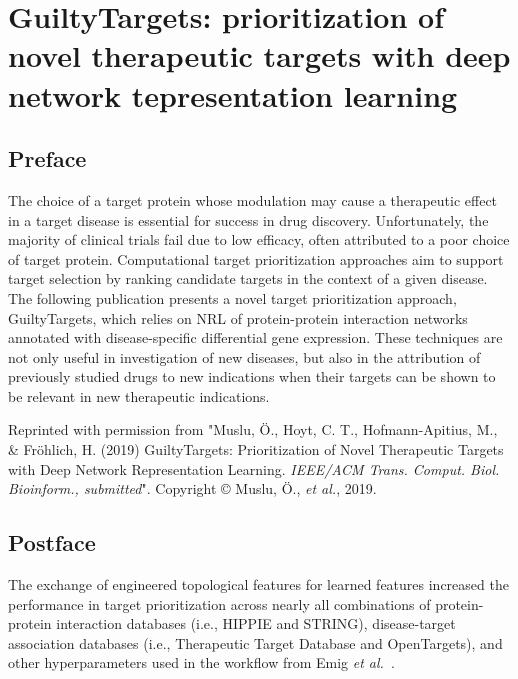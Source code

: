 \chapter{GuiltyTargets: prioritization of novel therapeutic targets with deep network tepresentation learning}
\label{ch:guiltytargets}

\section*{Preface}

The choice of a target protein whose modulation may cause a therapeutic effect in a target disease is essential for success in drug discovery.
Unfortunately, the majority of clinical trials fail due to low efficacy, often attributed to a poor choice of target protein.
Computational target prioritization approaches aim to support target selection by ranking candidate targets in the context of a given disease.
The following publication presents a novel target prioritization approach, GuiltyTargets, which relies on \ac{NRL} of protein-protein interaction networks annotated with disease-specific differential gene expression.
These techniques are not only useful in investigation of new diseases, but also in the attribution of previously studied drugs to new indications when their targets can be shown to be relevant in new therapeutic indications.

\vspace*{\fill}

Reprinted with permission from "Muslu, Ö., Hoyt, C. T., Hofmann-Apitius, M., \& Fröhlich, H. (2019) GuiltyTargets: Prioritization of Novel Therapeutic Targets with Deep Network Representation Learning. \textit{IEEE/ACM Trans. Comput. Biol. Bioinform., submitted}".
Copyright © Muslu, Ö., \textit{et al.}, 2019.



\section*{Postface}

The exchange of engineered topological features for learned features increased the performance in target prioritization across nearly all combinations of protein-protein interaction databases (i.e., HIPPIE and STRING), disease-target association databases (i.e., Therapeutic Target Database and OpenTargets), and other hyperparameters used in the workflow from Emig \textit{et al.}~\cite{Emig2013}.


